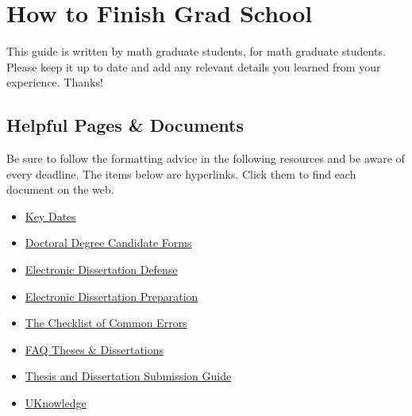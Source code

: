 \documentclass[final]{ukthesis} %
\begin{document}
\chapter{How to Finish Grad School}

This guide is written by math graduate students, for math graduate students. Please keep it up to date and add any relevant details you learned from your experience. Thanks!

\section{Helpful Pages \& Documents}

Be sure to follow the formatting advice in the following resources and be aware of every deadline. The items below are hyperlinks. Click them to find each document on the web.
\begin{itemize}

\item \href{http://gradschool.uky.edu/key-dates}{Key Dates}

\item \href{https://ris.uky.edu/cfdocs/gs/DoctoralCommittee/Selection_Screen.cfm}{Doctoral Degree Candidate Forms}

\item \href{http://gradschool.uky.edu/electronic-dissertation-defense}{Electronic Dissertation Defense}

\item \href{http://gradschool.uky.edu/electronic-dissertation-preparation}{Electronic Dissertation Preparation}

\item \href{http://gradschool.uky.edu/sites/gradschool.uky.edu/files/Documents/ThesisDissertationPrep/Checklist_Common_Errors_2019.pdf}{The Checklist of Common Errors}

\item \href{http://gradschool.uky.edu/faq-theses-dissertations}{FAQ Theses \& Dissertations}

\item \href{https://uknowledge.uky.edu/cgi/viewcontent.cgi?referer=http://gradschool.uky.edu/electronic-dissertation-defense&httpsredir=1&article=1006&context=uknowledge_docs}{Thesis and Dissertation Submission Guide}

\item \href{https://uknowledge.uky.edu/}{UKnowledge}

\end{itemize}
\end{document}
